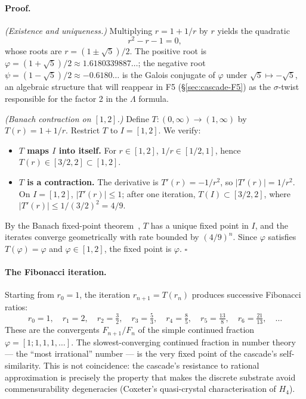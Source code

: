 \documentclass[11pt]{article}
\theoremstyle{plain}
\theoremstyle{definition}
\theoremstyle{remark}
\begin{document}
\paragraph{Proof.}
\emph{(Existence and uniqueness.)} Multiplying $r = 1 + 1/r$ by $r$ yields the quadratic
\[
  r^2 - r - 1 = 0,
\]
whose roots are $r = (1 \pm \sqrt 5)/2$. The positive root is $\varphi = (1 + \sqrt 5)/2 \approx 1.6180339887\ldots$; the negative root $\psi = (1 - \sqrt 5)/2 \approx -0.6180\ldots$ is the Galois conjugate of $\varphi$ under $\sqrt 5 \mapsto -\sqrt 5$, an algebraic structure that will reappear in F5 (\S\ref{sec:cascade-F5}) as the $\sigma$-twist responsible for the factor 2 in the $\Lambda$ formula.

\emph{(Banach contraction on $[1, 2]$.)} Define $T : (0, \infty) \to (1, \infty)$ by $T(r) = 1 + 1/r$. Restrict $T$ to $I = [1, 2]$. We verify:
\begin{itemize}[leftmargin=2em]
\item \textbf{$T$ maps $I$ into itself.} For $r \in [1, 2]$, $1/r \in [1/2, 1]$, hence $T(r) \in [3/2, 2] \subset [1, 2]$.
\item \textbf{$T$ is a contraction.} The derivative is $T'(r) = -1/r^2$, so $|T'(r)| = 1/r^2$. On $I = [1, 2]$, $|T'(r)| \le 1$; after one iteration, $T(I) \subset [3/2, 2]$, where $|T'(r)| \le 1/(3/2)^2 = 4/9$.
\end{itemize}
By the Banach fixed-point theorem~\citep{Banach1922}, $T$ has a unique fixed point in $I$, and the iterates converge geometrically with rate bounded by $(4/9)^n$. Since $\varphi$ satisfies $T(\varphi) = \varphi$ and $\varphi \in [1, 2]$, the fixed point is $\varphi$. \hfill$\square$

\paragraph{The Fibonacci iteration.} Starting from $r_0 = 1$, the iteration $r_{n+1} = T(r_n)$ produces successive Fibonacci ratios:
\[
  r_0 = 1, \quad r_1 = 2, \quad r_2 = \tfrac{3}{2}, \quad r_3 = \tfrac{5}{3}, \quad r_4 = \tfrac{8}{5}, \quad r_5 = \tfrac{13}{8}, \quad r_6 = \tfrac{21}{13}, \quad \ldots
\]
These are the convergents $F_{n+1}/F_n$ of the simple continued fraction $\varphi = [1; 1, 1, 1, \ldots]$. The slowest-converging continued fraction in number theory --- the ``most irrational'' number --- is the very fixed point of the cascade's self-similarity. This is not coincidence: the cascade's resistance to rational approximation is precisely the property that makes the discrete substrate avoid commensurability degeneracies (Coxeter's quasi-crystal characterisation of $H_4$).
\end{document}
